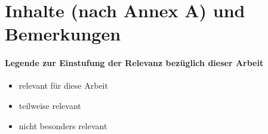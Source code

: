 \newcommand{\dotG}{{\color{green}\large$\bullet$}}
\newcommand{\dotY}{{\color{blue}\large$\bullet$}}
\newcommand{\dotR}{{\color{red}\large$\bullet$}}



\section{Inhalte (nach Annex A) und Bemerkungen}
\paragraph{Legende zur Einstufung der Relevanz bezüglich dieser Arbeit}
\begin{itemize}[leftmargin=2.5cm,labelsep=0.8em]
  \item[\dotG] relevant für diese Arbeit
  \item[\dotY] teilweise relevant
  \item[\dotR] nicht besonders relevant
\end{itemize}
\medskip

